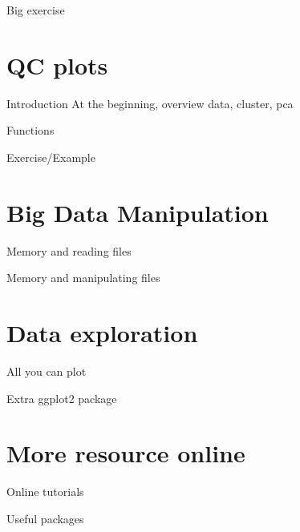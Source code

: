 \documentclass[10pt]{beamer}
\begin{document}
\begin{frame}{Big exercise}
  
\end{frame}

\section{QC plots}

\begin{frame}{Introduction}
  At the beginning, overview data, cluster, pca
\end{frame}

\begin{frame}{Functions}
  
\end{frame}

\begin{frame}{Exercise/Example}
  
\end{frame}

\section{Big Data Manipulation}

\begin{frame}{Memory and reading files}
  
\end{frame}

\begin{frame}{Memory and manipulating files}
  
\end{frame}

\section{Data exploration}

\begin{frame}{All you can plot}
  
\end{frame}

\begin{frame}{Extra ggplot2 package}
  
\end{frame}

\section{More resource online}

\begin{frame}{Online tutorials}
  
\end{frame}

\begin{frame}{Useful packages}
  
\end{frame}
\end{document}
